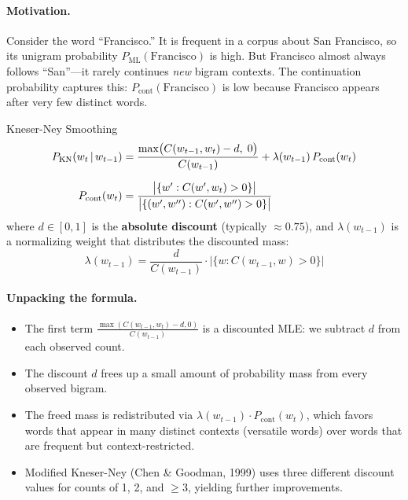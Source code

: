 \paragraph{Motivation.}
Consider the word ``Francisco.''  It is frequent in a corpus about San
Francisco, so its unigram probability $P_{\text{ML}}(\text{Francisco})$ is
high.  But Francisco almost always follows ``San''---it rarely continues
\emph{new} bigram contexts.  The continuation probability captures this:
$P_{\text{cont}}(\text{Francisco})$ is low because Francisco appears after
very few distinct words.

\begin{mathresult}{Kneser-Ney Smoothing}
\begin{align}
P_{\text{KN}}(w_t \,|\, w_{t-1})
&= \frac{\max\bigl(C(w_{t-1}, w_t) - d,\; 0\bigr)}{C(w_{t-1})}
  + \lambda(w_{t-1})\, P_{\text{cont}}(w_t)
\label{eq:kneser_ney} \\[6pt]
P_{\text{cont}}(w_t)
&= \frac{\bigl|\{w' : C(w', w_t) > 0\}\bigr|}
        {\bigl|\{(w', w'') : C(w', w'') > 0\}\bigr|}
\label{eq:continuation}
\end{align}
where $d \in [0, 1]$ is the \textbf{absolute discount} (typically $\approx 0.75$),
and $\lambda(w_{t-1})$ is a normalizing weight that distributes the discounted
mass:
\begin{equation}
\lambda(w_{t-1}) = \frac{d}{C(w_{t-1})} \cdot \bigl|\{w : C(w_{t-1}, w) > 0\}\bigr|
\label{eq:kn_lambda}
\end{equation}
\end{mathresult}

\paragraph{Unpacking the formula.}
\begin{itemize}
    \item The first term $\frac{\max(C(w_{t-1}, w_t) - d, 0)}{C(w_{t-1})}$
          is a discounted MLE: we subtract $d$ from each observed count.
    \item The discount $d$ frees up a small amount of probability mass from
          every observed bigram.
    \item The freed mass is redistributed via $\lambda(w_{t-1}) \cdot P_{\text{cont}}(w_t)$,
          which favors words that appear in many distinct contexts (versatile words)
          over words that are frequent but context-restricted.
    \item Modified Kneser-Ney (Chen \& Goodman, 1999) uses three different discount
          values for counts of 1, 2, and $\geq 3$, yielding further improvements.
\end{itemize}

